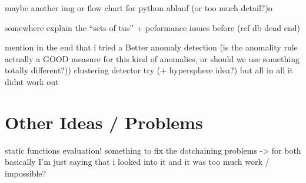 maybe another img or flow chart for python ablauf (or too much detail?)o

somewhere explain the ``sets of tus'' + peformance issues before (ref db dead end)


mention in the end that i tried a 
Better anomaly detection (is the anomality rule actually a GOOD measure for this kind of anomalies, or should we use something totally different?))
    clustering detector try (+ hypersphere idea?)
    but all in all it didnt work out

\section{Other Ideas / Problems}

static functions evaluation!
something to fix the dotchaining problems
-> for both basically I'm just saying that i looked into it and it was too much work / impossible?
